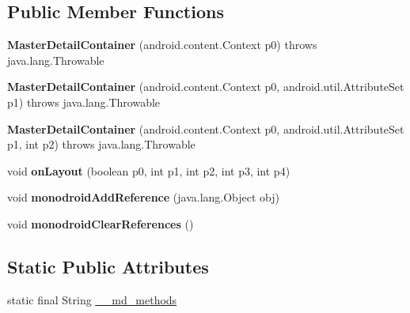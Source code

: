 \subsection*{Public Member Functions}
\begin{DoxyCompactItemize}
\item 
\mbox{\label{classmd5270abb39e60627f0f200893b490a1ade_1_1MasterDetailContainer_a9807f2073f88d818e7daa1d67838ea41}} 
{\bfseries Master\+Detail\+Container} (android.\+content.\+Context p0)  throws java.\+lang.\+Throwable 	
\item 
\mbox{\label{classmd5270abb39e60627f0f200893b490a1ade_1_1MasterDetailContainer_ac1707155566739333160760c52523d93}} 
{\bfseries Master\+Detail\+Container} (android.\+content.\+Context p0, android.\+util.\+Attribute\+Set p1)  throws java.\+lang.\+Throwable 	
\item 
\mbox{\label{classmd5270abb39e60627f0f200893b490a1ade_1_1MasterDetailContainer_afe89442bed68567e1df7fa008310532a}} 
{\bfseries Master\+Detail\+Container} (android.\+content.\+Context p0, android.\+util.\+Attribute\+Set p1, int p2)  throws java.\+lang.\+Throwable 	
\item 
\mbox{\label{classmd5270abb39e60627f0f200893b490a1ade_1_1MasterDetailContainer_af60c6a5b4b46f56b41eb0cd825f110de}} 
void {\bfseries on\+Layout} (boolean p0, int p1, int p2, int p3, int p4)
\item 
\mbox{\label{classmd5270abb39e60627f0f200893b490a1ade_1_1MasterDetailContainer_a31845d67e73cb6060fb8228c0a40c8d4}} 
void {\bfseries monodroid\+Add\+Reference} (java.\+lang.\+Object obj)
\item 
\mbox{\label{classmd5270abb39e60627f0f200893b490a1ade_1_1MasterDetailContainer_a93a5d443fda3e43f134d2522b7230b21}} 
void {\bfseries monodroid\+Clear\+References} ()
\end{DoxyCompactItemize}
\subsection*{Static Public Attributes}
\begin{DoxyCompactItemize}
\item 
static final String \hyperlink{classmd5270abb39e60627f0f200893b490a1ade_1_1MasterDetailContainer_ac82bf846b500c62b8736305937c47350}{\+\_\+\+\_\+md\+\_\+methods}
\end{DoxyCompactItemize}
